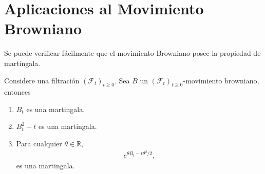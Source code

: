 \section{Aplicaciones al Movimiento Browniano}

Se puede verificar fácilmente que el movimiento Browniano posee la propiedad de martingala.

\begin{proposition}
\label{martin_continuas}
Considere una filtración $(\mathcal{F}_t)_{t \geq 0}$. Sea $B$ un $(\mathcal{F}_t)_{t \geq 0}$-movimiento browniano, entonces
\begin{enumerate}
\item $B_t$ es una martingala.
\item $B^2_t - t$ es una martingala.
\item Para cualquier $\theta \in \mathbb{R}$, 
\begin{align*}
e^{\theta B_t - t \theta^2 / 2},
\end{align*}
es una martingala.
\end{enumerate}
\end{proposition}
